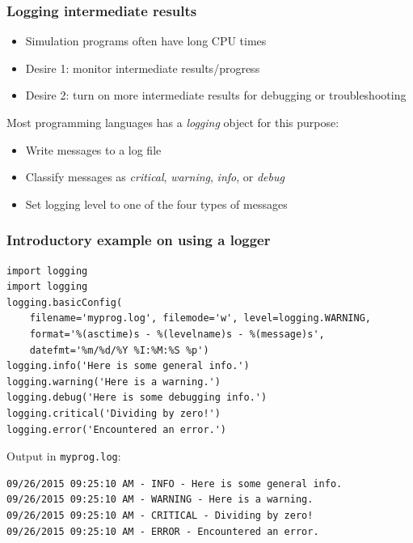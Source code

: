 \documentclass{beamer}
\begin{document}
\begin{frame}
\frametitle{Logging intermediate results}

\label{softeng1:basic:logging}

\begin{itemize}
 \item Simulation programs often have long CPU times

 \item Desire 1: monitor intermediate results/progress

 \item Desire 2: turn on more intermediate results for debugging or troubleshooting
\end{itemize}

\noindent
Most programming languages has a \emph{logging} object for this purpose:

\begin{itemize}
 \item Write messages to a log file

 \item Classify messages as \emph{critical}, \emph{warning}, \emph{info}, or \emph{debug}

 \item Set logging level to one of the four types of messages
\end{itemize}

\noindent
\end{frame}

\begin{frame}
\frametitle{Introductory example on using a logger}

\begin{verbatim}
import logging
import logging
logging.basicConfig(
    filename='myprog.log', filemode='w', level=logging.WARNING,
    format='%(asctime)s - %(levelname)s - %(message)s',
    datefmt='%m/%d/%Y %I:%M:%S %p')
logging.info('Here is some general info.')
logging.warning('Here is a warning.')
logging.debug('Here is some debugging info.')
logging.critical('Dividing by zero!')
logging.error('Encountered an error.')
\end{verbatim}

Output in \texttt{myprog.log}:

\begin{verbatim}
09/26/2015 09:25:10 AM - INFO - Here is some general info.
09/26/2015 09:25:10 AM - WARNING - Here is a warning.
09/26/2015 09:25:10 AM - CRITICAL - Dividing by zero!
09/26/2015 09:25:10 AM - ERROR - Encountered an error.
\end{verbatim}
\end{frame}
\end{document}
